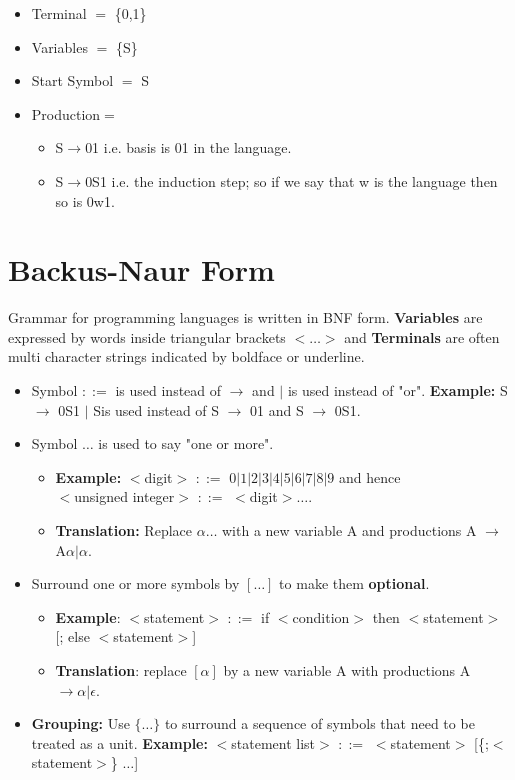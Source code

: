 \documentclass{report}
\begin{document}
    \begin{itemize}
        \item Terminal $=$ \{0,1\}
        \item Variables $=$ \{S\}
        \item Start Symbol $=$ S
        \item Production$=$
        \begin{itemize}
            \item S$\rightarrow$01 i.e. basis is 01 in the language. 
            \item S$\rightarrow$0S1 i.e. the induction step; so if we say that w is the language then so is 0w1. 
       \end{itemize}
    \end{itemize}

\section{Backus-Naur Form}
Grammar for programming languages is written in BNF form. \textbf{Variables} are expressed by words inside triangular brackets $<\ldots>$ and \textbf{Terminals} are often multi character strings indicated by boldface or underline. 
\begin{itemize}
    \item Symbol $::=$ is used instead of $\rightarrow$ and $|$ is used instead of "or". \textbf{Example:} S $\rightarrow$ 0S1 $|$ Sis used instead of S $\rightarrow$ 01 and S $\rightarrow$ 0S1.
    \item Symbol $\ldots$ is used to say "one or more". 
    \begin{itemize}
        \item \textbf{Example:} $<$digit$>$ $::=$ $0|1|2|3|4|5|6|7|8|9$ and hence \\
             $<$unsigned integer$>$ $::=$ $<$digit$> \ldots$.
        \item \textbf{Translation:} Replace $\alpha \ldots$ with a new variable A and productions A $\rightarrow$ A$\alpha | \alpha$.
    \end{itemize}
    \item Surround one or more symbols by $[\ldots]$ to make them \textbf{optional}. 
    \begin{itemize}
        \item \textbf{Example}: $<$statement$>$ $::=$ if $<$condition$>$ then $<$statement$>$ [; else $<$statement$>$] 
        \item \textbf{Translation}: replace $[\alpha]$ by a new variable A with productions A $\rightarrow \alpha | \epsilon$.
    \end{itemize}
    \item \textbf{Grouping:} Use $\{ \ldots \}$ to surround a sequence of symbols that need to be treated as a unit. \textbf{Example: }$<$statement list$>$ $::=$ $<$statement$>$ [\{;$<$statement$>$\} $\ldots$]
\end{itemize}
\end{document}
